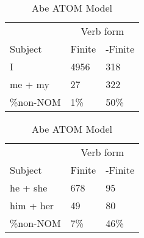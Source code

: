 \begin{table}[]
\caption{Abe ATOM Model}
\begin{minipage}{0.5\textwidth}
    \centering
    \begin{tabular}{@{}lll@{}}
        \toprule
         & \multicolumn{2}{c}{Verb form}\\
         \cline{2-3}
        Subject & Finite & -Finite \\
        \midrule
        I & 4956 & 318 \\
        me + my & 27 & 322 \\
        \hline
        \%non-NOM & 1\% & 50\% \\
        \bottomrule
    \end{tabular}
\end{minipage}
\begin{minipage}{0.5\textwidth}
    \centering
    \begin{tabular}{@{}lll@{}}
        \toprule
         & \multicolumn{2}{c}{Verb form}\\
         \cline{2-3}
        Subject & Finite & -Finite \\
        \midrule
        he + she & 678 & 95 \\
        him + her & 49 & 80 \\
        \hline
        \%non-NOM & 7\% & 46\% \\
        \bottomrule
    \end{tabular}
    \end{minipage}


\end{table}
